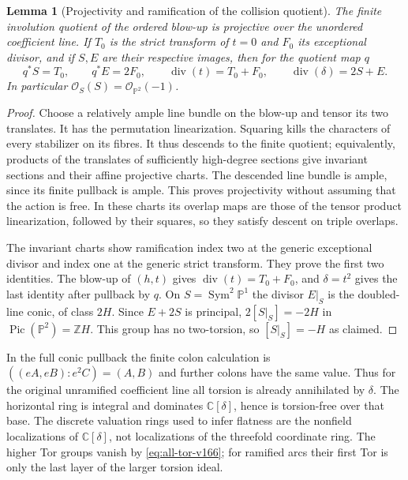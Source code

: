\documentclass[11pt,reqno]{amsart}
\numberwithin{equation}{section}
\newtheorem{lemma}[theorem]{Lemma}
\theoremstyle{definition}\newtheorem{definition}[theorem]{Definition}
\theoremstyle{remark}\newtheorem{remark}[theorem]{Remark}
\newcommand{\C}{\mathbb C}\newcommand{\Q}{\mathbb Q}
\newcommand{\Pj}{\mathbb P}\newcommand{\A}{\mathbb A}
\newcommand{\OO}{\mathcal O}\newcommand{\II}{\mathcal I}
\begin{document}
\begin{lemma}[Projectivity and ramification of the collision quotient]
\label{lem:quotient-projective-v166}
The finite involution quotient of the ordered blow-up is projective
over the unordered coefficient line. If $T_0$ is the strict
transform of $t=0$ and $F_0$ its exceptional divisor, and if $S,E$
are their respective images, then for the quotient map $q$
\[
 q^*S=T_0,\qquad q^*E=2F_0,\qquad
 \operatorname{div}(t)=T_0+F_0,\qquad
 \operatorname{div}(\delta)=2S+E.
\]
In particular $\OO_S(S)=\OO_{\Pj^2}(-1)$.
\end{lemma}
\begin{proof}
Choose a relatively ample line bundle on the blow-up and tensor
its two translates. It has the permutation linearization. Squaring
kills the characters of every stabilizer on its fibres. It thus
descends to the finite quotient; equivalently, products of the
translates of sufficiently high-degree sections give invariant
sections and their affine projective charts. The descended line
bundle is ample, since its finite pullback is ample. This proves
projectivity without assuming that the action is free. In these
charts its overlap maps are those of the tensor product
linearization, followed by their squares, so they satisfy descent
on triple overlaps.

The invariant charts show ramification index two at the generic
exceptional divisor and index one at the generic strict transform.
They prove the first two identities. The blow-up of $(h,t)$ gives
$\operatorname{div}(t)=T_0+F_0$, and $\delta=t^2$ gives the last
identity after pullback by $q$. On $S=\operatorname{Sym}^2\Pj^1$
the divisor $E|_S$ is the doubled-line conic, of class $2H$.
Since $E+2S$ is principal, $2[S|_S]=-2H$ in
$\operatorname{Pic}(\Pj^2)=\mathbb Z H$. This group has no
two-torsion, so $[S|_S]=-H$ as claimed.
\end{proof}

In the full conic pullback the finite colon calculation is
$((eA,eB):e^2C)=(A,B)$ and further colons have the same value.
Thus for the original unramified coefficient line all torsion is
already annihilated by $\delta$. The horizontal ring is integral
and dominates $\C[\delta]$, hence is torsion-free over that base.
The discrete valuation rings used to infer flatness are the
nonfield localizations of \emph{$\C[\delta]$}, not localizations
of the threefold coordinate ring. The higher Tor groups vanish
by \eqref{eq:all-tor-v166}; for ramified arcs their first Tor is
only the last layer of the larger torsion ideal.
\end{document}
